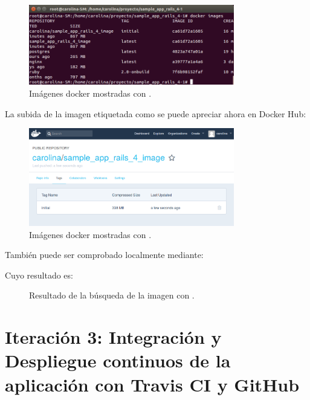 \begin{figure}[H]
\centering
\includegraphics[width=0.8\textwidth]{images/figures/dockerimages2.png}
\caption{Imágenes docker mostradas con .\label{fig:figure_placement_example}}
\end{figure}

La subida de la imagen etiquetada como  se puede apreciar ahora en Docker Hub:

\begin{figure}[H]
\centering
\includegraphics[width=0.8\textwidth]{images/figures/dockerhubinitial.png}
\caption{Imágenes docker mostradas con .\label{fig:figure_placement_example}}
\end{figure}

También puede ser comprobado localmente mediante:


Cuyo resultado es:

\begin{figure}[H]
\caption{Resultado de la búsqueda de la imagen con .\label{fig:figure_placement_example}}
\end{figure}

\section{Iteración 3: Integración y Despliegue continuos de la aplicación con Travis CI y GitHub}

